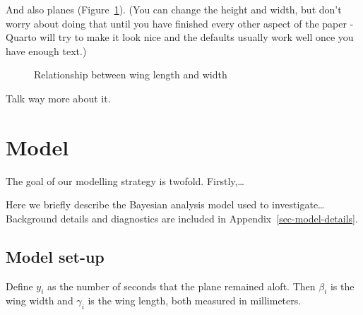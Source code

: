 \documentclass[
  letterpaper,
  DIV=11,
  numbers=noendperiod]{scrartcl}
\begin{document}
And also planes (Figure~\ref{fig-planes}). (You can change the height
and width, but don't worry about doing that until you have finished
every other aspect of the paper - Quarto will try to make it look nice
and the defaults usually work well once you have enough text.)

\begin{figure}


\caption{\label{fig-planes}Relationship between wing length and width}

\end{figure}%

Talk way more about it.

\section{Model}\label{model}

The goal of our modelling strategy is twofold. Firstly,\ldots{}

Here we briefly describe the Bayesian analysis model used to
investigate\ldots{} Background details and diagnostics are included in
Appendix~\ref{sec-model-details}.

\subsection{Model set-up}\label{model-set-up}

Define \(y_i\) as the number of seconds that the plane remained aloft.
Then \(\beta_i\) is the wing width and \(\gamma_i\) is the wing length,
both measured in millimeters.
\end{document}
